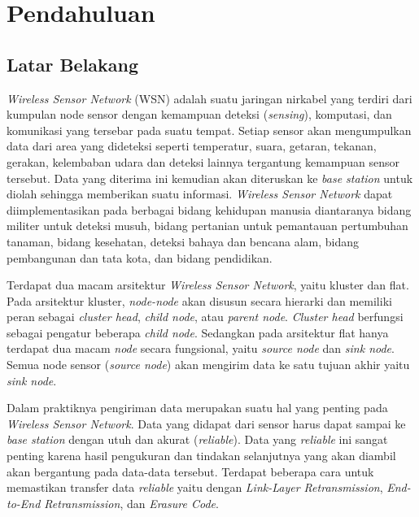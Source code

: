 \chapter{Pendahuluan}
\label{chap:intro}
   
\section{Latar Belakang}
\label{sec:label}

\textit{Wireless Sensor Network} (WSN) adalah suatu jaringan nirkabel yang terdiri dari kumpulan node sensor dengan kemampuan deteksi (\textit{sensing}), komputasi, dan komunikasi yang tersebar pada suatu tempat. Setiap sensor akan mengumpulkan data dari area yang dideteksi seperti temperatur, suara, getaran, tekanan, gerakan, kelembaban udara dan deteksi lainnya tergantung kemampuan sensor tersebut. Data yang diterima ini kemudian akan diteruskan ke \textit{base station} untuk diolah sehingga memberikan suatu informasi. \textit{Wireless Sensor Network} dapat diimplementasikan pada berbagai bidang kehidupan manusia diantaranya bidang militer untuk deteksi musuh, bidang pertanian untuk pemantauan pertumbuhan tanaman, bidang kesehatan, deteksi bahaya dan bencana alam, bidang pembangunan dan tata kota, dan bidang pendidikan.

Terdapat dua macam arsitektur \textit{Wireless Sensor Network}, yaitu kluster dan flat. Pada arsitektur kluster, \textit{node-node} akan disusun secara hierarki dan memiliki peran sebagai \textit{cluster head}, \textit{child node}, atau \textit{parent node}. \textit{Cluster head} berfungsi sebagai pengatur beberapa \textit{child node}. Sedangkan pada arsitektur flat hanya terdapat dua macam \textit{node} secara fungsional, yaitu \textit{source node} dan \textit{sink node}. Semua node sensor (\textit{source node}) akan mengirim data ke satu tujuan akhir yaitu \textit{sink node}.

Dalam praktiknya pengiriman data merupakan suatu hal yang penting pada \textit{Wireless Sensor Network}. Data yang didapat dari sensor harus dapat sampai ke \textit{base station} dengan utuh dan akurat (\textit{reliable}). Data yang \textit{reliable} ini sangat penting karena hasil pengukuran dan tindakan selanjutnya yang akan diambil akan bergantung pada data-data tersebut. Terdapat beberapa cara untuk memastikan transfer data \textit{reliable} yaitu dengan \textit{Link-Layer Retransmission}, \textit{End-to-End Retransmission}, dan \textit{Erasure Code}.

